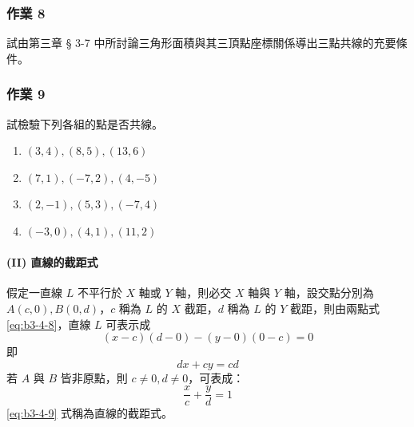 \subsubsection*{作業 8}
試由第三章 § 3-7 中所討論三角形面積與其三頂點座標關係導出三點共線的充要條件。

\subsubsection*{作業 9}
試檢驗下列各組的點是否共線。
\begin{enumerate}[label=(\roman*), leftmargin=2em]
  \item $(3, 4), (8, 5), (13, 6)$
  \item $(7, 1), (-7, 2), (4, -5)$
  \item $(2, -1), (5, 3), (-7, 4)$
  \item $(-3, 0), (4, 1), (11, 2)$
\end{enumerate}

\paragraph*{(II) 直線的截距式}
假定一直線 $L$ 不平行於 $X$ 軸或 $Y$ 軸，則必交 $X$ 軸與 $Y$ 軸，設交點分別為 $A(c, 0), B(0, d)$，$c$ 稱為 $L$ 的 $X$ 截距，$d$ 稱為 $L$ 的 $Y$ 截距，則由兩點式 \eqref{eq:b3-4-8}，直線 $L$ 可表示成
\[ (x - c)(d - 0) - (y - 0)(0 - c) = 0 \]
即
\[ dx + cy = cd \]
若 $A$ 與 $B$ 皆非原點，則 $c \neq 0, d \neq 0$，可表成：
\begin{equation}
\frac{x}{c} + \frac{y}{d} = 1
\label{eq:b3-4-9}
\end{equation}
\eqref{eq:b3-4-9} 式稱為直線的截距式。

